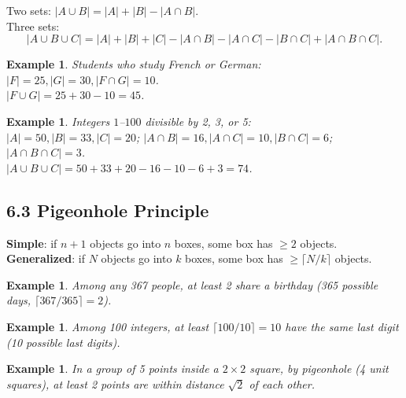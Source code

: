 \documentclass[11pt]{article}
\newtheorem{example}[definition]{Example}
\begin{document}
\begin{tcolorbox}[keybox={Inclusion--Exclusion}]
\vspace{2pt}
Two sets: $|A\cup B|=|A|+|B|-|A\cap B|$.\\[4pt]
Three sets:
\[|A\cup B\cup C|=|A|+|B|+|C|-|A\cap B|-|A\cap C|-|B\cap C|+|A\cap B\cap C|.\]
\end{tcolorbox}

\begin{example}
Students who study French or German: $|F|=25,|G|=30,|F\cap G|=10$.\\
$|F\cup G|=25+30-10=45$.
\end{example}

\begin{example}
Integers $1$–$100$ divisible by 2, 3, or 5:\\
$|A|=50,|B|=33,|C|=20$; $|A\cap B|=16,|A\cap C|=10,|B\cap C|=6$; $|A\cap B\cap C|=3$.\\
$|A\cup B\cup C|=50+33+20-16-10-6+3=74$.
\end{example}

\subsection*{6.3 Pigeonhole Principle}

\begin{tcolorbox}[keybox={Pigeonhole}]
\textbf{Simple}: if $n+1$ objects go into $n$ boxes, some box has $\ge2$ objects.\\
\textbf{Generalized}: if $N$ objects go into $k$ boxes, some box has $\ge\lceil N/k\rceil$ objects.
\end{tcolorbox}

\begin{example}
Among any 367 people, at least 2 share a birthday (365 possible days, $\lceil367/365\rceil=2$).
\end{example}

\begin{example}
Among 100 integers, at least $\lceil100/10\rceil=10$ have the same last digit (10 possible last digits).
\end{example}

\begin{example}
In a group of 5 points inside a $2\times2$ square, by pigeonhole (4 unit squares), at least 2 points are within distance $\sqrt2$ of each other.
\end{example}
\end{document}
